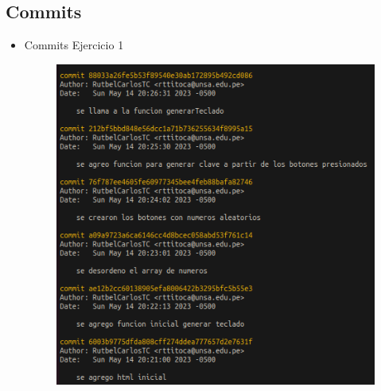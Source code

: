 \documentclass{article}
\begin{document}
\subsection{Commits}
\begin{itemize}
	\item Commits Ejercicio 1
	\begin{figure}[H]
	    \centering
	    \includegraphics[scale=0.5]{img/commits/commit-ejercicio1.png}
	\end{figure}
	      

\end{itemize}
\end{document}
